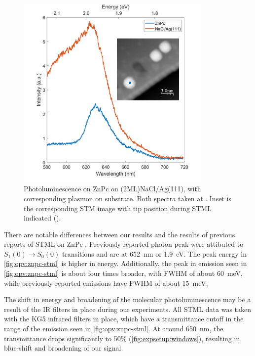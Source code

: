 \begin{figure} [h]
    \centering
    \includegraphics[width=0.85\textwidth]{pictures/znpc_+ve_emission_inset.png}
    \caption{Photoluminescence on ZnPc on (2ML)NaCl/Ag(111), with corresponding plasmon on substrate. Both spectra taken at . Inset is the corresponding STM image with tip position during STML indicated (). }
    \label{fig:opv:znpc-stml}
\end{figure}

There are notable differences between our results and the results of previous reports of \ac{STML} on ZnPc \citep{Zhang2016, Doppagne2017, Zhang2017, Doppagne2018}. Previously reported photon peak were attibuted to $S_1(0) \rightarrow S_0(0)$ transitions and are at \SI{652}{nm} or \SI{1.9}{eV}. The peak energy in \autoref{fig:opv:znpc-stml} is higher in energy. Additionally, the peak in emission seen in \autoref{fig:opv:znpc-stml} is about four times broader, with \ac{FWHM} of about \SI{60}{meV}, while previously reported emissions have \ac{FWHM} of about \SI{15}{meV}.

The shift in energy and broadening of the molecular photoluminescence may be a result of the IR filters in place during our experiments. All \ac{STML} data was taken with the KG5 infrared filters in place, which have a transmittance cutoff in the range of the emission seen in \autoref{fig:opv:znpc-stml}. At around \SI{650}{nm}, the transmittance drops significantly to 50\% (\autoref{fig:expsetup:windows}), resulting in blue-shift and broadening of our signal. 

